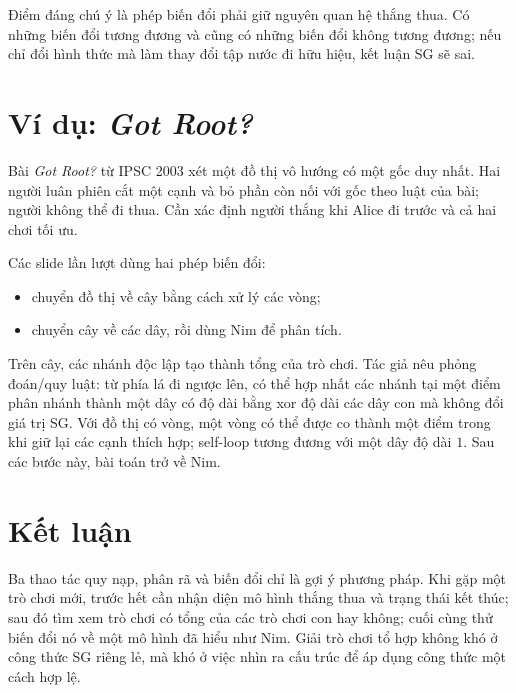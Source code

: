 \documentclass[11pt]{article}
\begin{document}
Điểm đáng chú ý là phép biến đổi phải giữ nguyên quan hệ thắng thua. Có những
biến đổi tương đương và cũng có những biến đổi không tương đương; nếu chỉ đổi
hình thức mà làm thay đổi tập nước đi hữu hiệu, kết luận SG sẽ sai.

\section{Ví dụ: \textit{Got Root?}}

Bài \textit{Got Root?} từ IPSC 2003 xét một đồ thị vô hướng có một gốc duy
nhất. Hai người luân phiên cắt một cạnh và bỏ phần còn nối với gốc theo luật
của bài; người không thể đi thua. Cần xác định người thắng khi Alice đi trước
và cả hai chơi tối ưu.

Các slide lần lượt dùng hai phép biến đổi:
\begin{itemize}
  \item chuyển đồ thị về cây bằng cách xử lý các vòng;
  \item chuyển cây về các dây, rồi dùng Nim để phân tích.
\end{itemize}

Trên cây, các nhánh độc lập tạo thành tổng của trò chơi. Tác giả nêu phỏng
đoán/quy luật: từ phía lá đi ngược lên, có thể hợp nhất các nhánh tại một điểm
phân nhánh thành một dây có độ dài bằng xor độ dài các dây con mà không đổi
giá trị SG. Với đồ thị có vòng, một vòng có thể được co thành một điểm trong
khi giữ lại các cạnh thích hợp; self-loop tương đương với một dây độ dài
\(1\). Sau các bước này, bài toán trở về Nim.

\section{Kết luận}

Ba thao tác quy nạp, phân rã và biến đổi chỉ là gợi ý phương pháp. Khi gặp một
trò chơi mới, trước hết cần nhận diện mô hình thắng thua và trạng thái kết
thúc; sau đó tìm xem trò chơi có tổng của các trò chơi con hay không; cuối
cùng thử biến đổi nó về một mô hình đã hiểu như Nim. Giải trò chơi tổ hợp
không khó ở công thức SG riêng lẻ, mà khó ở việc nhìn ra cấu trúc để áp dụng
công thức một cách hợp lệ.
\end{document}
